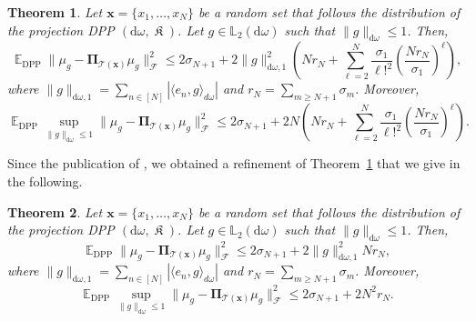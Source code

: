 \documentclass[twoside,11pt]{book}
\newtheorem{theorem}{Theorem}
\numberwithin{theorem}{chapter}
\numberwithin{definition}{chapter}
\numberwithin{proposition}{chapter}
\numberwithin{corollary}{chapter}
\numberwithin{example}{chapter}
\numberwithin{lemma}{chapter}
\DeclareMathOperator{\DPP}{\mathrm{DPP}}
\DeclareMathOperator{\EX}{\mathbb{E}}
\DeclareMathOperator*{\KDPP}{\mathfrak{K}}
\begin{document}
\begin{theorem}\label{thm:main_theorem}
Let $\bm{x} = \{x_{1}, \dots , x_{N}\}$ be a random set that follows the distribution of the projection DPP $(\mathrm{d}\omega, \KDPP )$. Let $g \in \mathbb{L}_{2}(\mathrm{d}\omega)$ such that $\|g\|_{\mathrm{d}\omega} \leq 1$. Then, 
\begin{equation}\label{eq:main_result_first}
\EX_{\DPP} \|\mu_{g} - \bm{\Pi}_{\mathcal{T}(\bm{x})} \mu_{g}\|_{\mathcal{F}}^{2}  \leq
2\sigma_{N+1} +2\|g\|_{\mathrm{d}\omega,1}^{2}\left(   N r_{N} + \sum\limits_{\ell =2}^{N} \frac{\sigma_{1}}{\ell!^{2}}\left(\frac{Nr_{N}}{\sigma_{1}}\right)^{\ell} \right),
\end{equation}
where $\displaystyle \|g\|_{\mathrm{d}\omega,1} = \sum\limits_{n \in [N]} |\langle e_{n},g \rangle_{d\omega}|$ and $r_{N} = \sum\limits_{m \geq N+1} \sigma_{m}$. Moreover, 
\begin{equation}\label{eq:main_result_sup_first}
\EX_{\DPP} \sup\limits_{\|g\|_{\mathrm{d}\omega} \leq 1} \|\mu_{g} - \bm{\Pi}_{\mathcal{T}(\bm{x})} \mu_{g}\|_{\mathcal{F}}^{2}  \leq
2\sigma_{N+1} +2N\left(   N r_{N} + \sum\limits_{\ell =2}^{N} \frac{\sigma_{1}}{\ell!^{2}}\left(\frac{Nr_{N}}{\sigma_{1}}\right)^{\ell} \right).
\end{equation}
\end{theorem}


Since the publication of \citep{BeBaCh19}, we obtained a refinement of Theorem~\ref{thm:main_theorem} that we give in the following.


\begin{theorem}\label{thm:main_theorem_improved}
Let $\bm{x} = \{x_{1}, \dots , x_{N}\}$ be a random set that follows the distribution of the projection DPP $(\mathrm{d}\omega, \KDPP )$. Let $g \in \mathbb{L}_{2}(\mathrm{d}\omega)$ such that $\|g\|_{\mathrm{d}\omega} \leq 1$. Then, 
\begin{equation}\label{eq:main_result}
\EX_{\DPP} \|\mu_{g} - \bm{\Pi}_{\mathcal{T}(\bm{x})} \mu_{g}\|_{\mathcal{F}}^{2}  \leq
2\sigma_{N+1} +2\|g\|_{\mathrm{d}\omega,1}^{2} N r_{N} ,
\end{equation}
where $\displaystyle \|g\|_{\mathrm{d}\omega,1} = \sum\limits_{n \in [N]} |\langle e_{n},g \rangle_{d\omega}|$ and $r_{N} = \sum\limits_{m \geq N+1} \sigma_{m}$. Moreover, 
\begin{equation}\label{eq:main_result_sup}
\EX_{\DPP} \sup\limits_{\|g\|_{\mathrm{d}\omega} \leq 1} \|\mu_{g} - \bm{\Pi}_{\mathcal{T}(\bm{x})} \mu_{g}\|_{\mathcal{F}}^{2}  \leq
2\sigma_{N+1} +2N^{2} r_{N}.
\end{equation}
\end{theorem}
\end{document}
